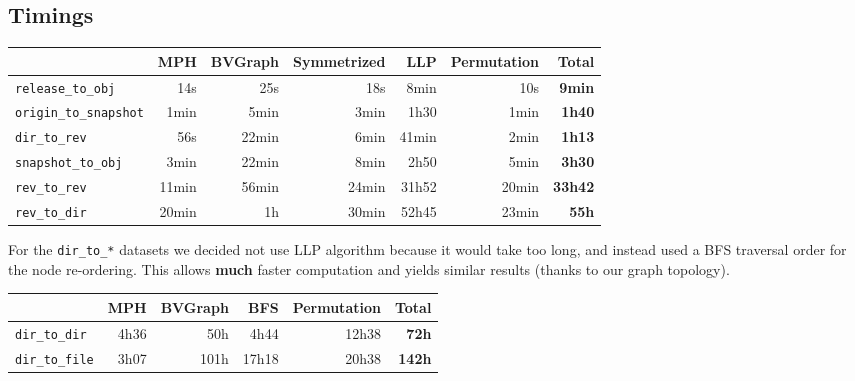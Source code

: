 \documentclass[11pt,a4paper]{article}
\begin{document}

\subsection{Timings}

\begin{center}
    \begin{tabular}{@{} l *6r @{}}
        \toprule
        \multicolumn{1}{c}{} &
            \textbf{MPH} &
            \textbf{BVGraph} &
            \textbf{Symmetrized} &
            \textbf{LLP} &
            \textbf{Permutation} &
            \textbf{Total} \\
        \midrule
        \texttt{release\_to\_obj}
            & 14s & 25s & 18s & 8min & 10s & \textbf{9min} \\
        \texttt{origin\_to\_snapshot}
            & 1min & 5min & 3min & 1h30 & 1min & \textbf{1h40} \\
        \texttt{dir\_to\_rev}
            & 56s & 22min & 6min & 41min & 2min & \textbf{1h13} \\
        \texttt{snapshot\_to\_obj}
            & 3min & 22min & 8min & 2h50 & 5min & \textbf{3h30} \\
        \texttt{rev\_to\_rev}
            & 11min & 56min & 24min & 31h52 & 20min & \textbf{33h42} \\
        \texttt{rev\_to\_dir}
            & 20min & 1h & 30min & 52h45 & 23min & \textbf{55h} \\
        \bottomrule
    \end{tabular}
\end{center}

\vspace{0.5cm}

For the \texttt{dir_to_*} datasets we decided not use LLP algorithm
because it would take too long, and instead used a BFS traversal order for the
node re-ordering. This allows \textbf{much} faster computation and yields
similar results (thanks to our graph topology).

\vspace{0.5cm}

\begin{center}
    \begin{tabular}{@{} l *5r @{}}
        \toprule
        \multicolumn{1}{c}{} &
            \textbf{MPH} &
            \textbf{BVGraph} &
            \textbf{BFS} &
            \textbf{Permutation} &
            \textbf{Total} \\
        \midrule
        \texttt{dir\_to\_dir}
            & 4h36 & 50h & 4h44 & 12h38 & \textbf{72h} \\
        \texttt{dir\_to\_file}
            & 3h07 & 101h & 17h18 & 20h38 & \textbf{142h} \\
        \bottomrule
    \end{tabular}
\end{center}
\end{document}
